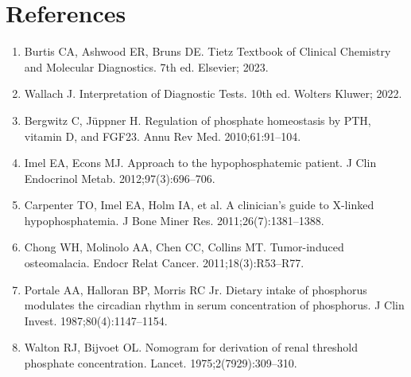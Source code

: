 \section*{References}
\begin{enumerate}
  \item Burtis CA, Ashwood ER, Bruns DE. Tietz Textbook of Clinical Chemistry and Molecular Diagnostics. 7th ed. Elsevier; 2023.
  \item Wallach J. Interpretation of Diagnostic Tests. 10th ed. Wolters Kluwer; 2022.
  \item Bergwitz C, J\"{u}ppner H. Regulation of phosphate homeostasis by PTH, vitamin D, and FGF23. Annu Rev Med. 2010;61:91--104.
  \item Imel EA, Econs MJ. Approach to the hypophosphatemic patient. J Clin Endocrinol Metab. 2012;97(3):696--706.
  \item Carpenter TO, Imel EA, Holm IA, et al. A clinician's guide to X-linked hypophosphatemia. J Bone Miner Res. 2011;26(7):1381--1388.
  \item Chong WH, Molinolo AA, Chen CC, Collins MT. Tumor-induced osteomalacia. Endocr Relat Cancer. 2011;18(3):R53--R77.
  \item Portale AA, Halloran BP, Morris RC Jr. Dietary intake of phosphorus modulates the circadian rhythm in serum concentration of phosphorus. J Clin Invest. 1987;80(4):1147--1154.
  \item Walton RJ, Bijvoet OL. Nomogram for derivation of renal threshold phosphate concentration. Lancet. 1975;2(7929):309--310.
\end{enumerate}

\clearpage

